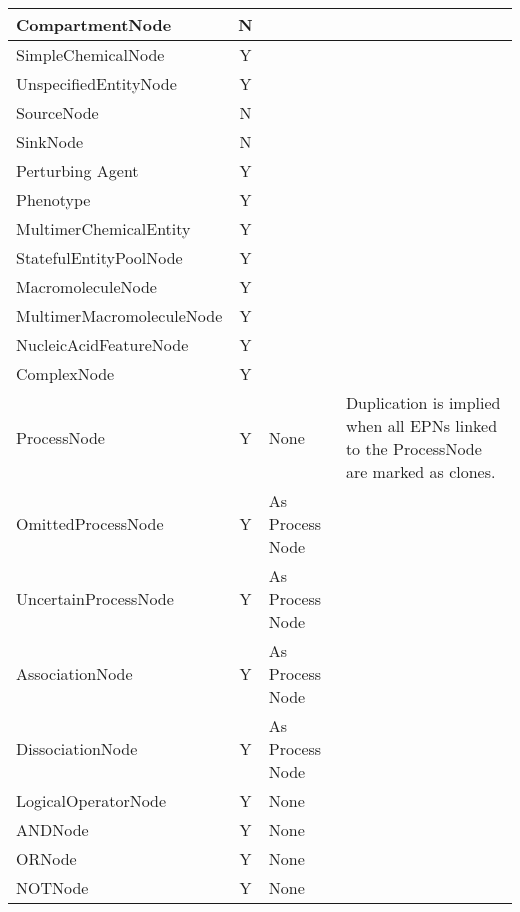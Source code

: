 \begin{center}
\label{tab:processduprules}
\begin{footnotesize}
\tablelasttail{\hline}
\begin{supertabular}{|l|c|p{4cm}|p{3.5cm}|}\hline
CompartmentNode   & N & & \\\hline
SimpleChemicalNode & Y &  & \\\hline
UnspecifiedEntityNode & Y &  & \\\hline
SourceNode & N & & \\\hline
SinkNode & N & & \\\hline
Perturbing Agent & Y &  & \\\hline
Phenotype & Y &  & \\\hline
MultimerChemicalEntity & Y &  & \\\hline
StatefulEntityPoolNode & Y &  & \\\hline
MacromoleculeNode & Y &  & \\\hline
MultimerMacromoleculeNode & Y &  & \\\hline
Nucleic\-Acid\-FeatureNode & Y &  & \\\hline
ComplexNode & Y &  & \\\hline
ProcessNode & Y & None & Duplication is implied when all EPNs linked to the ProcessNode are marked as clones.\\\hline
OmittedProcessNode & Y & As Process Node & \\\hline
UncertainProcessNode & Y & As Process Node & \\\hline
AssociationNode & Y & As Process Node & \\\hline
DissociationNode & Y & As Process Node & \\\hline
LogicalOperatorNode & Y & None & \\\hline
ANDNode & Y & None & \\\hline
ORNode & Y & None & \\\hline
NOTNode & Y & None & \\\hline
\end{supertabular}
\end{footnotesize}
\end{center}

